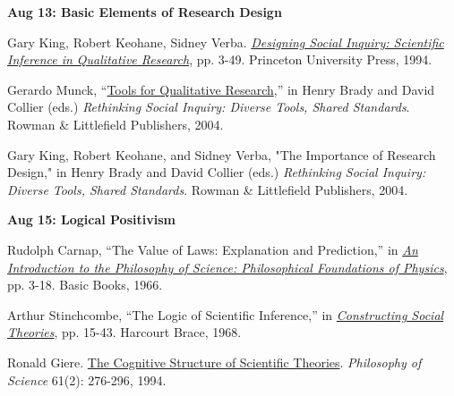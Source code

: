 \documentclass[letterpaper]{article}
\renewenvironment{itemize}{
  \begin{list}{}{
    \setlength{\leftmargin}{1.5em}
  }
}{
  \end{list}
}
\begin{document}
\begin{enumerate}
	\begin{itemize}
		\item {\bf Aug 13: Basic Elements of Research Design}
		\begin{itemize}
			\item[$\bullet$] Gary King, Robert Keohane, Sidney Verba. \href{https://sites.duke.edu/niou/files/2014/06/king94book.pdf}{\emph{Designing Social Inquiry: Scientific Inference in Qualitative Research}}, pp. 3-49. Princeton University Press, 1994.
			\item[$\bullet$] Gerardo Munck, ``\href{https://www.researchgate.net/profile/Gerardo_Munck/publication/275658363_Tools_for_Qualitative_Research/links/5543d6aa0cf23ff71685246b/Tools-for-Qualitative-Research.pdf?_sg%5B0%5D=r_R0BVrbsZuiuUXoAJ0eTIfTaBGDEmHwU9Fvy4Iy84l1eEXqwnkOwNaxe4H3GrNHCW_-JejGObDf18Hd0q4xGQ.bhboK7u6gIPsRQjPj9MO00N3wm97omzXr30hewGtE8ZkeuycaF6m-lRDEsnccltioSavZt3o-DFMdyIdbAwolw&_sg%5B1%5D=k17BN3VARUYm3n_uwfSOMdFxcWWaz3MKHTNzc4Qsmr2oipNZDi9zhpyXXhBLeS4OaCOYox1jNLjN-U81wEptAsy92oFLbTsIKkIJLmgLxLW7.bhboK7u6gIPsRQjPj9MO00N3wm97omzXr30hewGtE8ZkeuycaF6m-lRDEsnccltioSavZt3o-DFMdyIdbAwolw&_iepl=}{Tools for Qualitative Research},'' in  Henry Brady and David Collier (eds.) \emph{Rethinking Social Inquiry: Diverse Tools, Shared Standards}. Rowman \& Littlefield Publishers, 2004.
			\item[$\bullet$] Gary King, Robert Keohane, and Sidney Verba, "The Importance of Research Design," in  Henry Brady and David Collier (eds.) \emph{Rethinking Social Inquiry: Diverse Tools, Shared Standards}. Rowman \& Littlefield Publishers, 2004. 
		\end{itemize}
	\end{itemize}


		\begin{itemize}
		\item {\bf Aug 15: Logical Positivism}
			\begin{itemize}
				\item[$\bullet$] Rudolph Carnap, ``The Value of Laws: Explanation and Prediction,'' in \href{https://archive.org/details/PhilosophicalFoundationsOfPhysics}{\emph{An Introduction to the Philosophy of Science: Philosophical Foundations of Physics}}, pp. 3-18. Basic Books, 1966.
				\item[$\bullet$] Arthur Stinchcombe, ``The Logic of Scientific Inference,'' in \href{http://www.nyu.edu/classes/jackson/design.of.social.research/Readings/Stinchcombe%20-%20Constructing%20Soc%20Thry%20Ch%202.pdf}{\emph{Constructing Social Theories}}, pp. 15-43. Harcourt Brace, 1968.
				\item[$\bullet$] Ronald Giere. \href{https://www.journals.uchicago.edu/doi/pdfplus/10.1086/289800}{The Cognitive Structure of Scientific Theories}. \emph{Philosophy of Science} 61(2): 276-296, 1994.
			\end{itemize}
		\end{itemize}



\end{enumerate}
\end{document}
